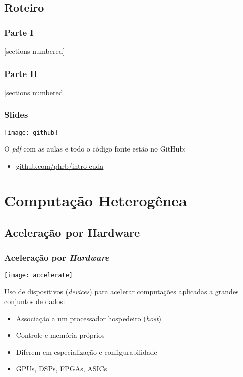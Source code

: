 \documentclass[10pt, compress]{beamer}
\begin{document}
\subsection{Roteiro}

\begin{frame}
    \frametitle{Parte I}
    [sections numbered]
    \tableofcontents[hideallsubsections, part=1]
\end{frame}

\begin{frame}
    \frametitle{Parte II}
    [sections numbered]
    \tableofcontents[hideallsubsections, part=2]
\end{frame}

\begin{frame}
    \frametitle{Slides}
    \begin{center}
        \texttt{[image: github]}
    \end{center}
    O \emph{pdf} com as aulas e todo o código fonte estão no \alert{GitHub}:

    \begin{itemize}
        \item \url{github.com/phrb/intro-cuda}
    \end{itemize}
\end{frame}


\section{Computação Heterogênea}

\subsection{Aceleração por Hardware}

\begin{frame}
    \frametitle{Aceleração por \textit{Hardware}}
    \begin{center}
        \texttt{[image: accelerate]}
    \end{center}

    Uso de \alert{dispositivos} (\textit{devices}) para acelerar computações
    aplicadas a grandes conjuntos de dados:
    \begin{itemize}
        \item Associação a um processador \alert{hospedeiro} (\textit{host})
        \item \alert{Controle} e \alert{memória} próprios
        \item Diferem em \alert{especialização} e \alert{configurabilidade}
        \item \alert{GPUs}, DSPs, FPGAs, ASICs
    \end{itemize}
\end{frame}
\end{document}

